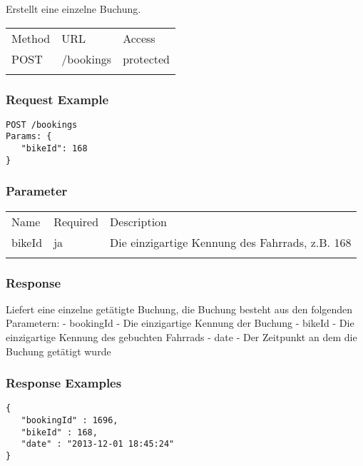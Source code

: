 Erstellt eine einzelne Buchung.

\begin{longtable}[c]{@{}lll@{}}
\toprule\addlinespace
Method & URL & Access
\\\addlinespace
\midrule\endhead
POST & /bookings & protected
\\\addlinespace
\bottomrule
\end{longtable}

\subsubsection{Request Example}\label{request-example}

\begin{verbatim}
POST /bookings
Params: {
   "bikeId": 168
}
\end{verbatim}

\subsubsection{Parameter}\label{parameter}

\begin{longtable}[c]{@{}lll@{}}
\toprule\addlinespace
Name & Required & Description
\\\addlinespace
\midrule\endhead
bikeId & ja & Die einzigartige Kennung des Fahrrads, z.B. 168
\\\addlinespace
\bottomrule
\end{longtable}

\subsubsection{Response}\label{response}

Liefert eine einzelne getätigte Buchung, die Buchung besteht aus den
folgenden Parametern: - bookingId - Die einzigartige Kennung der Buchung
- bikeId - Die einzigartige Kennung des gebuchten Fahrrads - date - Der
Zeitpunkt an dem die Buchung getätigt wurde

\subsubsection{Response Examples}\label{response-examples}

\begin{verbatim}
{
   "bookingId" : 1696,
   "bikeId" : 168,
   "date" : "2013-12-01 18:45:24"
}
\end{verbatim}
